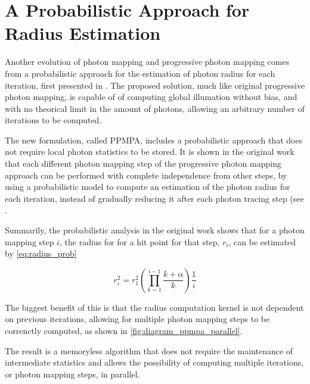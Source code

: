 \documentclass[main.tex]{subfiles}
\begin{document}
\section{A Probabilistic Approach for Radius Estimation} \label{section:ppmpa}


Another evolution of photon mapping and progressive photon mapping comes from a probabilistic approach for the estimation of photon radius for each iteration, first presented in \cite{knaus2011progressive}. The proposed solution, much like original progressive photon mapping, is capable of of computing global illumation without bias, and with no theorical limit in the amount of photons, allowing an arbitrary number of iterations to be computed.

The new formulation, called PPMPA, includes a probabilistic approach that does not require local photon statistics to be stored. It is shown in the original work that each different photon mapping step of the progressive photon mapping approach can be performed with complete independence from other steps, by using a probabilistic model to compute an estimation of the photon radius for each iteration, instead of gradually reducing it after each photon tracing step (see .


Summarily, the probabilistic analysis in the original work shows that for a photon mapping step $i$, the radius for for a hit point for that step, $r_{i}$, can be estimated by \cref{eq:radius_prob}

\begin{figure}[!htp]
  \begin{equation}
    r^{2}_{i} = r^{2}_{1} (\prod\limits^{i-1}_{k=1} \frac{k + \alpha}{k}) \frac{1}{i}
  \label{eq:radius_prob}
  \end{equation}
\end{figure}


The biggest benefit of this is that the radius computation kernel is not dependent on previous iterations, allowing for multiple photon mapping steps to be correnctly computed, as shown in \cref{fig:diagram_ppmpa_parallel}.


The result is a memoryless algorithm that does not require the maintenance of intermediate statistics and allows the possibility of computing multiple iterations, or photon mapping steps, in parallel.


\end{document}
